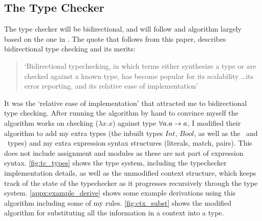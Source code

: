 \subsection{The Type Checker}
The type checker will be bidirectional, and will follow and algorithm largely based on the one in \cite{completebidir}. The quote that follows from this paper, describes bidirectional type checking and its merits:
\begin{quote}
`Bidirectional typechecking, in which terms either synthesize a type or are checked against a known type, has become popular for its scalability \ldots its error reporting, and its relative ease of implementation' \cite{completebidir}
\end{quote}
\noindent It was the `relative ease of implementation' that attracted me to bidirectional type checking. After running the algorithm by hand to convince myself the algorithm works on checking ($\lambda x. x$) against type $\forall a.a\rightarrow a$, I modified their algorithm to add my extra types (the inbuilt types $Int$, $Bool$, as well as the \Uniontype\ and \Producttype\ types) and my extra expression syntax structures (literals, match, pairs). This does not include assignment and modules as these are not part of expression syntax. \ref{fig:tc_types} shows the type system, including the typechecker implementation details, as well as the unmodified context structure, which keeps track of the state of the typechecker as it progresses recursively through the type system. \ref{appx:example_derive} shows some example derivations using this algorithm including some of my rules. \ref{fig:ctx_subst} shows the modified algorithm for substituting all the information in a context into a type. 




